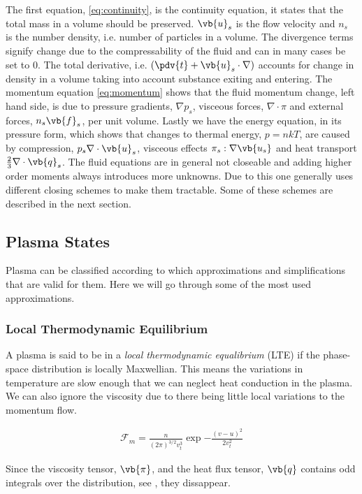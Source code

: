 	The first equation, \cref{eq:continuity}, is the continuity equation, it states that the total mass
	in a volume	should be preserved. \(\vb{u}_s\) is the flow velocity and \(n_s\) is the number density, i.e.
	number of particles in a volume. The divergence terms signify change due to the compressability of the fluid
	and can in many cases be set to \(0\). The total derivative, i.e. \(\left(\pdv{t} + \vb{u}_s\cdot\nabla \right)\) accounts for
	change in density in a volume taking into account substance exiting and entering.
	The momentum equation \cref{eq:momentum} shows that the fluid momentum change, left hand side,
	is due to pressure gradients, \(\nabla p_s\), visceous forces, \(\nabla \cdot \pi \) and external forces, \(n_s\vb{f}_s\),
	per unit volume.
	Lastly we have the energy equation, in its pressure form, which shows that changes to thermal
	energy, \(p = nkT\), are caused by compression, \(p_s\nabla \cdot \vb{u}_s\), visceous effects \(\pi_s : \nabla{\vb{u_s}}\)
	and heat transport	\(\frac{2}{3}\nabla \cdot \vb{q}_s\).
	The fluid equations are in general not closeable and adding higher order moments
	always introduces more unknowns. Due to this one generally uses different closing
	schemes to make them tractable. Some of these schemes are described in the next section.

\subsection{Plasma States}
	Plasma can be classified according to which	approximations and simplifications
	that are valid for them. Here we will go through some of the most used approximations.

	\subsubsection{Local Thermodynamic Equilibrium}
	A plasma is said to be in a \textit{local thermodynamic equalibrium} (LTE)
	if the phase-space distribution is locally Maxwellian. This means the variations
	in temperature are slow enough that we can neglect heat conduction in the plasma. We can also ignore
	the viscosity due to there being little local variations to the momentum flow.

	\begin{align}
		\mathcal{F}_m = \frac{n}{(2\pi )^{3/2}v_t^3} \exp{-\frac{(v-u)^2}{2v_t^2}}
	\end{align}

	Since the viscosity tensor, \(\vb{\pi}\), and the heat flux tensor, \(\vb{q}\)
	contains odd integrals over the distribution, see \citet{fitzpatrick_plasma_2014},
	they dissappear.

